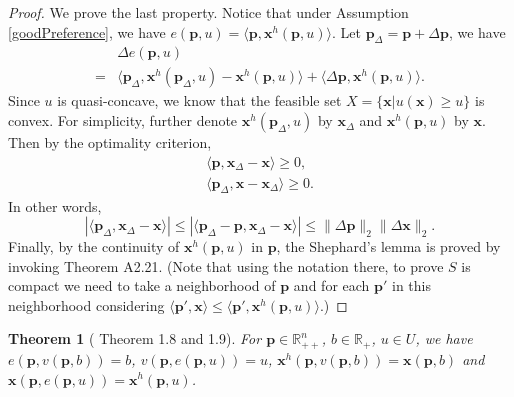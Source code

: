 \documentclass[openany]{book}
\newtheorem{theorem}{Theorem}[chapter]
\theoremstyle{remark}
\begin{document}
\begin{proof}
    We prove the last property. Notice that under Assumption \ref{goodPreference}, we have $e(\boldsymbol{p},u)=\langle \boldsymbol{p},\boldsymbol{x}^h(\boldsymbol{p},u)\rangle$. Let $\boldsymbol{p}_{\Delta}=\boldsymbol{p}+\Delta \boldsymbol{p}$, we have
    \begin{equation*}
        \begin{array}{rl}
             & \Delta e(\boldsymbol{p},u) \\
            = & \langle \boldsymbol{p}_{\Delta},\boldsymbol{x}^h(\boldsymbol{p}_{\Delta},u)-\boldsymbol{x}^h(\boldsymbol{p},u)\rangle+\langle\Delta \boldsymbol{p},\boldsymbol{x}^h(\boldsymbol{p},u)\rangle.
        \end{array}
    \end{equation*}
    Since $u$ is quasi-concave, we know that the feasible set $X=\{\boldsymbol{x}|u(\boldsymbol{x})\ge u\}$ is convex. For simplicity, further denote $\boldsymbol{x}^h(\boldsymbol{p}_{\Delta},u)$ by $\boldsymbol{x}_{\Delta}$ and $\boldsymbol{x}^h(\boldsymbol{p},u)$ by $\boldsymbol{x}$. Then by the optimality criterion,
    \begin{equation*}
        \begin{array}{c}
            \langle \boldsymbol{p},\boldsymbol{x}_{\Delta}-\boldsymbol{x}\rangle\ge0, \\
            \langle \boldsymbol{p}_{\Delta},\boldsymbol{x}-\boldsymbol{x}_{\Delta}\rangle\ge0.
        \end{array}
    \end{equation*}
    In other words,
    \begin{equation*}
        |\langle \boldsymbol{p}_{\Delta},\boldsymbol{x}_{\Delta}-\boldsymbol{x}\rangle|\le|\langle \boldsymbol{p}_{\Delta}-\boldsymbol{p},\boldsymbol{x}_{\Delta}-\boldsymbol{x}\rangle|\le\|\Delta \boldsymbol{p}\|_2\|\Delta \boldsymbol{x}\|_2.
    \end{equation*}
    Finally, by the continuity of $\boldsymbol{x}^h(\boldsymbol{p},u)$ in $\boldsymbol{p}$, the Shephard's lemma is proved by invoking \cite{J01} Theorem A2.21. (Note that using the notation there, to prove $S$ is compact we need to take a neighborhood of $\boldsymbol{p}$ and for each $\boldsymbol{p}'$ in this neighborhood considering $\langle \boldsymbol{p}',\boldsymbol{x}\rangle\le \langle \boldsymbol{p}',\boldsymbol{x}^h(\boldsymbol{p},u)\rangle$.)
\end{proof}
\begin{theorem}[\cite{J01} Theorem 1.8 and 1.9]
    For $\boldsymbol{p}\in \mathbb{R}_{++}^n$, $b\in \mathbb{R}_+$, $u\in U$, we have $e(\boldsymbol{p},v(\boldsymbol{p},b))=b$, $v(\boldsymbol{p},e(\boldsymbol{p},u))=u$, $\boldsymbol{x}^h(\boldsymbol{p},v(\boldsymbol{p},b))=\boldsymbol{x}(\boldsymbol{p},b)$ and $\boldsymbol{x}(\boldsymbol{p},e(\boldsymbol{p},u))=\boldsymbol{x}^h(\boldsymbol{p},u)$.
\end{theorem}
\end{document}
